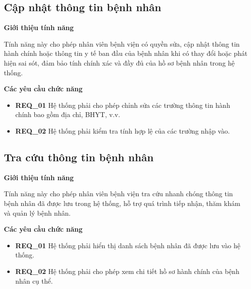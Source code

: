 \subsection{Cập nhật thông tin bệnh nhân}

\noindent \textbf{Giới thiệu tính năng}

Tính năng này cho phép nhân viên bệnh viện có quyền sửa, cập nhật thông tin hành chính hoặc thông tin y tế ban đầu của bệnh nhân khi có thay đổi hoặc phát hiện sai sót, đảm bảo tính chính xác và đầy đủ của hồ sơ bệnh nhân trong hệ thống.

\noindent \textbf{Các yêu cầu chức năng}

\begin{itemize}
  \item \textbf{REQ\_01} Hệ thống phải cho phép chỉnh sửa các trường thông tin hành chính bao gồm địa chỉ, BHYT, v.v.
  \item \textbf{REQ\_02} Hệ thống phải kiểm tra tính hợp lệ của các trường nhập vào.
\end{itemize}

\subsection{Tra cứu thông tin bệnh nhân}

\noindent \textbf{Giới thiệu tính năng}

Tính năng này cho phép nhân viên bệnh viện tra cứu nhanh chóng thông tin bệnh nhân đã được lưu trong hệ thống, hỗ trợ quá trình tiếp nhận, thăm khám và quản lý bệnh nhân.

\noindent \textbf{Các yêu cầu chức năng}

\begin{itemize}
  \item \textbf{REQ\_01} Hệ thống phải hiển thị danh sách bệnh nhân đã được lưu vào hệ thống.
  \item \textbf{REQ\_02} Hệ thống phải cho phép xem chi tiết hồ sơ hành chính của bệnh nhân cụ thể.
\end{itemize}
